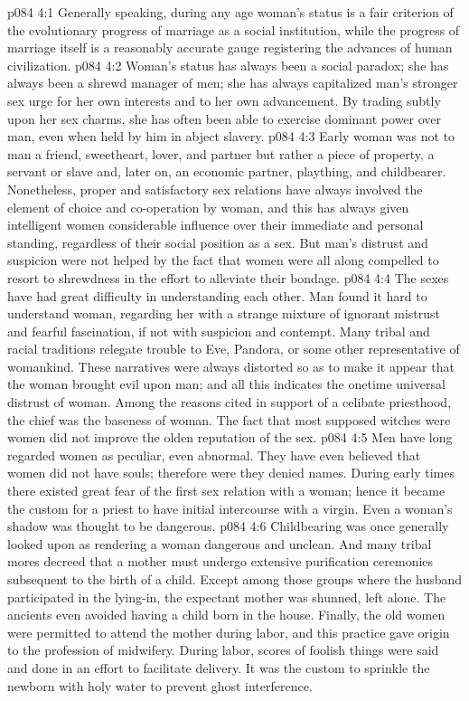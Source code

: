 \vs p084 4:1 Generally speaking, during any age woman’s status is a fair criterion of the evolutionary progress of marriage as a social institution, while the progress of marriage itself is a reasonably accurate gauge registering the advances of human civilization.
\vs p084 4:2 \pc Woman’s status has always been a social paradox; she has always been a shrewd manager of men; she has always capitalized man’s stronger sex urge for her own interests and to her own advancement. By trading subtly upon her sex charms, she has often been able to exercise dominant power over man, even when held by him in abject slavery.
\vs p084 4:3 Early woman was not to man a friend, sweetheart, lover, and partner but rather a piece of property, a servant or slave and, later on, an economic partner, plaything, and childbearer. Nonetheless, proper and satisfactory sex relations have always involved the element of choice and co\hyp{}operation by woman, and this has always given intelligent women considerable influence over their immediate and personal standing, regardless of their social position as a sex. But man’s distrust and suspicion were not helped by the fact that women were all along compelled to resort to shrewdness in the effort to alleviate their bondage.
\vs p084 4:4 \pc The sexes have had great difficulty in understanding each other. Man found it hard to understand woman, regarding her with a strange mixture of ignorant mistrust and fearful fascination, if not with suspicion and contempt. Many tribal and racial traditions relegate trouble to Eve, Pandora, or some other representative of womankind. These narratives were always distorted so as to make it appear that the woman brought evil upon man; and all this indicates the onetime universal distrust of woman. Among the reasons cited in support of a celibate priesthood, the chief was the baseness of woman. The fact that most supposed witches were women did not improve the olden reputation of the sex.
\vs p084 4:5 Men have long regarded women as peculiar, even abnormal. They have even believed that women did not have souls; therefore were they denied names. During early times there existed great fear of the first sex relation with a woman; hence it became the custom for a priest to have initial intercourse with a virgin. Even a woman’s shadow was thought to be dangerous.
\vs p084 4:6 Childbearing was once generally looked upon as rendering a woman dangerous and unclean. And many tribal mores decreed that a mother must undergo extensive purification ceremonies subsequent to the birth of a child. Except among those groups where the husband participated in the lying\hyp{}in, the expectant mother was shunned, left alone. The ancients even avoided having a child born in the house. Finally, the old women were permitted to attend the mother during labor, and this practice gave origin to the profession of midwifery. During labor, scores of foolish things were said and done in an effort to facilitate delivery. It was the custom to sprinkle the newborn with holy water to prevent ghost interference.
